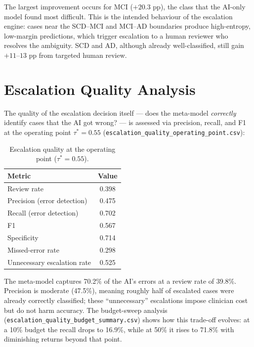 \documentclass[12pt, a4paper]{report}
\begin{document}
  The largest improvement occurs for MCI ($+20.3$ pp), the class that the AI-only
  model found most difficult.  This is the intended behaviour of the escalation
  engine: cases near the SCD--MCI and MCI--AD boundaries produce high-entropy,
  low-margin predictions, which trigger escalation to a human reviewer who resolves
  the ambiguity.  SCD and AD, although already well-classified, still gain $+11$--$13$
  pp from targeted human review.

  \section{Escalation Quality Analysis}
  \label{sec:escalation-quality}

  The quality of the escalation decision itself --- does the meta-model
  \emph{correctly} identify cases that the AI got wrong? --- is assessed via
  precision, recall, and F1 at the operating point $\tau^* = 0.55$
  (\texttt{escalation\_quality\_operating\_point.csv}):

  \begin{table}[htbp]
    \centering
    \caption{Escalation quality at the operating point ($\tau^* = 0.55$).}
    \label{tab:escalation-quality}
    \begin{tabular}{lS}
      \toprule
      {Metric} & {Value} \\
      \midrule
      Review rate           & 0.398 \\
      Precision (error detection) & 0.475 \\
      Recall (error detection)    & 0.702 \\
      F1                          & 0.567 \\
      Specificity                 & 0.714 \\
      Missed-error rate           & 0.298 \\
      Unnecessary escalation rate & 0.525 \\
      \bottomrule
    \end{tabular}
  \end{table}

  The meta-model captures 70.2\% of the AI's errors at a review rate of 39.8\%.
  Precision is moderate (47.5\%), meaning roughly half of escalated cases were
  already correctly classified; these ``unnecessary'' escalations impose clinician
  cost but do not harm accuracy.  The budget-sweep analysis
  (\texttt{escalation\_quality\_budget\_summary.csv}) shows how this trade-off
  evolves: at a 10\% budget the recall drops to 16.9\%, while at 50\% it rises to
  71.8\% with diminishing returns beyond that point.
\end{document}
